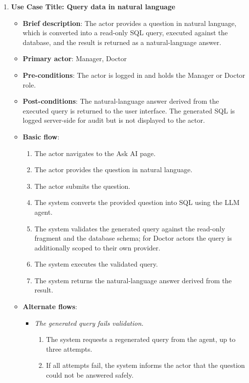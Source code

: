 \begin{enumerate}
\vspace{0.5em}

\item \textbf{Use Case Title: Query data in natural language}
\begin{itemize}
    \item \textbf{Brief description}: The actor provides a question in natural language, which is converted into a read-only SQL query, executed against the database, and the result is returned as a natural-language answer.
    \item \textbf{Primary actor}: Manager, Doctor
    \item \textbf{Pre-conditions}: The actor is logged in and holds the Manager or Doctor role.
    \item \textbf{Post-conditions}: The natural-language answer derived from the executed query is returned to the user interface. The generated SQL is logged server-side for audit but is not displayed to the actor.
    \item \textbf{Basic flow}:
    \begin{enumerate}
        \item The actor navigates to the Ask AI page.
        \item The actor provides the question in natural language.
        \item The actor submits the question.
        \item The system converts the provided question into SQL using the LLM agent.
        \item The system validates the generated query against the read-only fragment and the database schema; for Doctor actors the query is additionally scoped to their own provider.
        \item The system executes the validated query.
        \item The system returns the natural-language answer derived from the result.
    \end{enumerate}
    \item \textbf{Alternate flows}:
    \begin{itemize}
        \item[5a.] \textit{The generated query fails validation.}
        \begin{enumerate}
            \item The system requests a regenerated query from the agent, up to three attempts.
            \item If all attempts fail, the system informs the actor that the question could not be answered safely.
        \end{enumerate}
    \end{itemize}
\end{itemize}


\end{enumerate}
